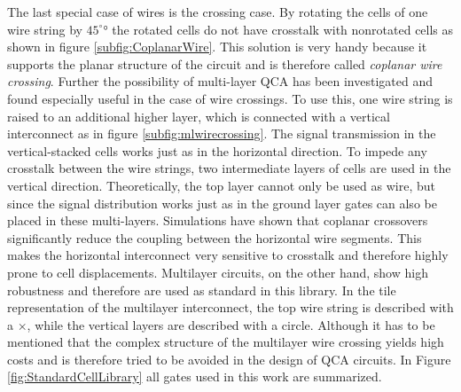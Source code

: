 The last special case of wires is the crossing case. By rotating the cells of one wire string by $45^{\circ}°$ the rotated cells do not have crosstalk with nonrotated cells \cite{Inverter_displacements} as shown in figure \ref{subfig:CoplanarWire}. This solution is very handy because it supports the planar structure of the circuit and is therefore called \textit{coplanar wire crossing}. Further the possibility of multi-layer QCA has been investigated \cite{multi_lyer_wire_crossing} and found especially useful in the case of wire crossings. To use this, one wire string is raised to an additional higher layer, which is connected with a vertical interconnect as in figure \ref{subfig:mlwirecrossing}. The signal transmission in the vertical-stacked cells works just as in the horizontal direction. To impede any crosstalk between the wire strings, two intermediate layers of cells are used in the vertical direction. Theoretically, the top layer cannot only be used as wire, but since the signal distribution works just as in the ground layer gates can also be placed in these multi-layers. Simulations have shown that coplanar crossovers significantly reduce the coupling between the horizontal wire segments. This makes the horizontal interconnect very sensitive to crosstalk and therefore highly prone to cell displacements. Multilayer circuits, on the other hand, show high robustness and therefore are used as standard in this library. In the tile representation of the multilayer interconnect, the top wire string is described with a $\times$, while the vertical layers are described with a circle. Although it has to be mentioned that the complex structure of the multilayer wire crossing yields high costs and is therefore tried to be avoided in the design of QCA circuits. In Figure \ref{fig:StandardCellLibrary} all gates used in this work are summarized.

